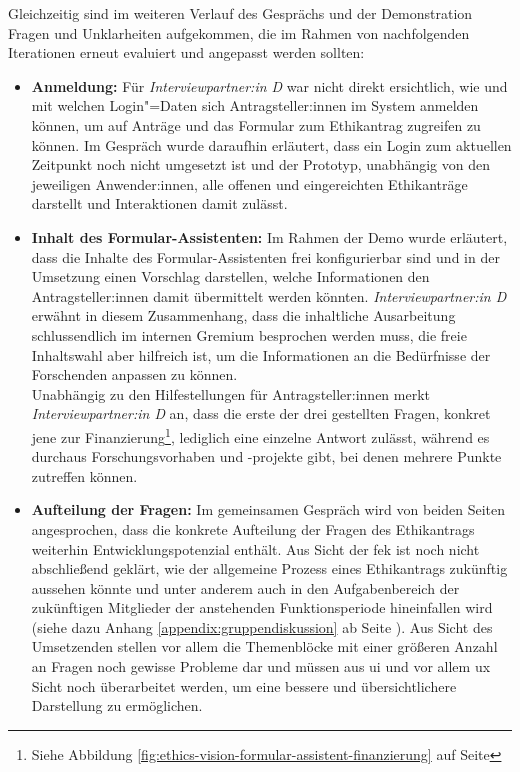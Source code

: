\documentclass[a4paper,12pt,twoside,numbers=noendperiod]{scrreprt}
\begin{document}
Gleichzeitig sind im weiteren Verlauf des Gesprächs und der Demonstration Fragen und Unklarheiten aufgekommen, die im Rahmen von nachfolgenden Iterationen erneut evaluiert und angepasst werden sollten:
\begin{itemize}
    \item \textbf{Anmeldung:} Für \textit{Interviewpartner:in D} war nicht direkt ersichtlich, wie und mit welchen Login"=Daten sich Antragsteller:innen im System anmelden können, um auf Anträge und das Formular zum Ethikantrag zugreifen zu können. Im Gespräch wurde daraufhin erläutert, dass ein Login zum aktuellen Zeitpunkt noch nicht umgesetzt ist und der Prototyp, unabhängig von den jeweiligen Anwender:innen, alle offenen und eingereichten Ethikanträge darstellt und Interaktionen damit zulässt.
    \item \textbf{Inhalt des Formular-Assistenten:} Im Rahmen der Demo wurde erläutert, dass die Inhalte des Formular-Assistenten frei konfigurierbar sind und in der Umsetzung einen Vorschlag darstellen, welche Informationen den Antragsteller:innen damit übermittelt werden könnten. \textit{Interviewpartner:in D} erwähnt in diesem Zusammenhang, dass die inhaltliche Ausarbeitung schlussendlich im internen Gremium besprochen werden muss, die freie Inhaltswahl aber hilfreich ist, um die Informationen an die Bedürfnisse der Forschenden anpassen zu können.\\
    Unabhängig zu den Hilfestellungen für Antragsteller:innen merkt \textit{Interviewpartner:in D} an, dass die erste der drei gestellten Fragen, konkret jene zur Finanzierung\footnote{Siehe Abbildung \ref{fig:ethics-vision-formular-assistent-finanzierung} auf Seite \pageref{fig:ethics-vision-formular-assistent-finanzierung}}, lediglich eine einzelne Antwort zulässt, während es durchaus Forschungsvorhaben und -projekte gibt, bei denen mehrere Punkte zutreffen können.
    \item \textbf{Aufteilung der Fragen:} Im gemeinsamen Gespräch wird von beiden Seiten angesprochen, dass die konkrete Aufteilung der Fragen des Ethikantrags weiterhin Entwicklungspotenzial enthält. Aus Sicht der \ac{fek} ist noch nicht abschließend geklärt, wie der allgemeine Prozess eines Ethikantrags zukünftig aussehen könnte und unter anderem auch in den Aufgabenbereich der zukünftigen Mitglieder der anstehenden Funktionsperiode hineinfallen wird (siehe dazu Anhang \ref{appendix:gruppendiskussion} ab Seite \pageref{appendix:gruppendiskussion}). Aus Sicht des Umsetzenden stellen vor allem die Themenblöcke mit einer größeren Anzahl an Fragen noch gewisse Probleme dar und müssen aus \ac{ui} und vor allem \ac{ux} Sicht noch überarbeitet werden, um eine bessere und übersichtlichere Darstellung zu ermöglichen.

\end{itemize}
\end{document}
